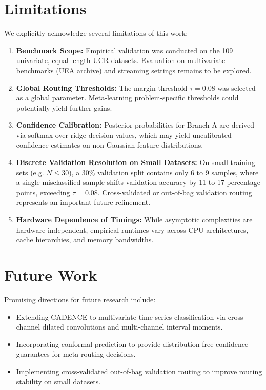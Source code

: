 \documentclass[journal,twocolumn]{article}
\begin{document}
\section{Limitations}
We explicitly acknowledge several limitations of this work:
\begin{enumerate}
    \item \textbf{Benchmark Scope:} Empirical validation was conducted on the 109 univariate, equal-length UCR datasets. Evaluation on multivariate benchmarks (UEA archive) and streaming settings remains to be explored.
    \item \textbf{Global Routing Thresholds:} The margin threshold $\tau = 0.08$ was selected as a global parameter. Meta-learning problem-specific thresholds could potentially yield further gains.
    \item \textbf{Confidence Calibration:} Posterior probabilities for Branch A are derived via softmax over ridge decision values, which may yield uncalibrated confidence estimates on non-Gaussian feature distributions.
    \item \textbf{Discrete Validation Resolution on Small Datasets:} On small training sets (e.g. $N \le 30$), a 30\% validation split contains only 6 to 9 samples, where a single misclassified sample shifts validation accuracy by 11 to 17 percentage points, exceeding $\tau = 0.08$. Cross-validated or out-of-bag validation routing represents an important future refinement.
    \item \textbf{Hardware Dependence of Timings:} While asymptotic complexities are hardware-independent, empirical runtimes vary across CPU architectures, cache hierarchies, and memory bandwidths.
\end{enumerate}

\section{Future Work}
Promising directions for future research include:
\begin{itemize}
    \item Extending CADENCE to multivariate time series classification via cross-channel dilated convolutions and multi-channel interval moments.
    \item Incorporating conformal prediction to provide distribution-free confidence guarantees for meta-routing decisions.
    \item Implementing cross-validated out-of-bag validation routing to improve routing stability on small datasets.
\end{itemize}
\end{document}
